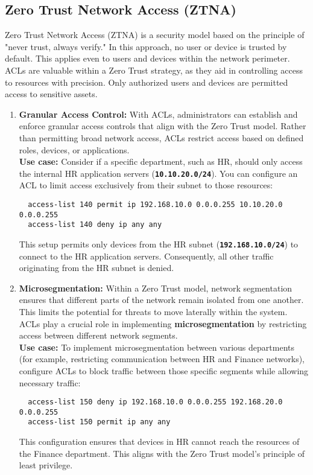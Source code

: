 \documentclass[11pt,a4paper]{article}
\begin{document}
    \subsection*{Zero Trust Network Access (ZTNA)}
    Zero Trust Network Access (ZTNA) is a security model based on the principle of "never trust, always verify." In this approach, no user or device is trusted by default. This applies even to users and devices within the network perimeter. ACLs are valuable within a Zero Trust strategy, as they aid in controlling access to resources with precision. Only authorized users and devices are permitted access to sensitive assets.

    \begin{enumerate}
        \item \textbf{Granular Access Control:} With ACLs, administrators can establish and enforce granular access controls that align with the Zero Trust model. Rather than permitting broad network access, ACLs restrict access based on defined roles, devices, or applications.
        \\[1em]
        \textbf{Use case:} Consider if a specific department, such as HR, should only access the internal HR application servers (\textbf{\lstinline{10.10.20.0/24}}). You can configure an ACL to limit access exclusively from their subnet to those resources:
\begin{lstlisting}
  access-list 140 permit ip 192.168.10.0 0.0.0.255 10.10.20.0 0.0.0.255
  access-list 140 deny ip any any                                                       
\end{lstlisting}
        This setup permits only devices from the HR subnet (\textbf{\lstinline{192.168.10.0/24}}) to connect to the HR application servers. Consequently, all other traffic originating from the HR subnet is denied.


        \item \textbf{Microsegmentation:} Within a Zero Trust model, network segmentation ensures that different parts of the network remain isolated from one another. This limits the potential for threats to move laterally within the system. ACLs play a crucial role in implementing \textbf{microsegmentation} by restricting access between different network segments.
        \\[1em]
        \textbf{Use case:} To implement microsegmentation between various departments (for example, restricting communication between HR and Finance networks), configure ACLs to block traffic between those specific segments while allowing necessary traffic:
\begin{lstlisting}
  access-list 150 deny ip 192.168.10.0 0.0.0.255 192.168.20.0 0.0.0.255
  access-list 150 permit ip any any                                
\end{lstlisting}
        This configuration ensures that devices in HR cannot reach the resources of the Finance department. This aligns with the Zero Trust model's principle of least privilege.

    \end{enumerate}
\end{document}
